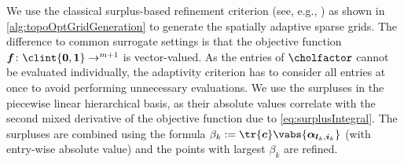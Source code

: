 We use the classical surplus-based refinement criterion
(see, e.g., \cite{Pflueger10Spatially})
as shown in \cref{alg:topoOptGridGeneration}
to generate the spatially adaptive sparse grids.
The difference to common surrogate settings is that the objective function
$\*f\colon \clint{\*0, \*1} \to \real^{m+1}$ is vector-valued.
As the entries of $\cholfactor$ cannot be evaluated individually,
the adaptivity criterion has to consider all entries at once
to avoid performing unnecessary evaluations.
We use the surpluses in the piecewise linear hierarchical basis,
as their absolute values correlate with the second mixed derivative
of the objective function due to \cref{eq:surplusIntegral}.
The surpluses are combined using the formula
$\beta_k := \tr{\*c} \vabs{\vsurplus_{\*l_k,\*i_k}}$
(with entry-wise absolute value) and the
points with largest $\beta_k$ are refined.

